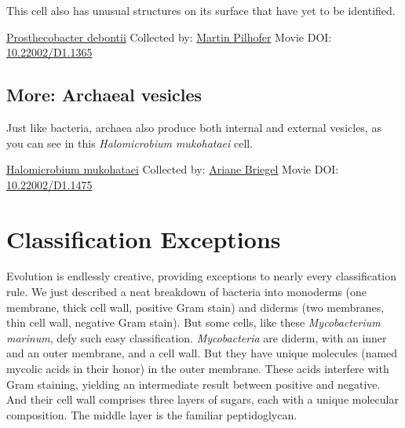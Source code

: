 \documentclass[]{tufte-book}
\begin{document}
This cell also has unusual structures on its surface that have yet to be identified.



\hypertarget{htmlwidget-8624b873ec5ec49f3b6a}{}

\label{fig:2-4d}\protect\hyperlink{tree}{Prosthecobacter debontii} Collected by: \protect\hyperlink{martin_pilhofer}{Martin Pilhofer} Movie DOI: \href{https://doi.org/10.22002/D1.1365}{10.22002/D1.1365}

\hypertarget{Archaeal_vesicles}{%
\subsection*{More: Archaeal vesicles}\label{Archaeal_vesicles}}

Just like bacteria, archaea also produce both internal and external vesicles, as you can see in this \emph{Halomicrobium mukohataei} cell.



\hypertarget{htmlwidget-d303e43101472cea8dda}{}

\label{fig:2-4e}\protect\hyperlink{tree}{Halomicrobium mukohataei} Collected by: \protect\hyperlink{ariane_briegel}{Ariane Briegel} Movie DOI: \href{https://doi.org/10.22002/D1.1475}{10.22002/D1.1475}

\hypertarget{classification-exceptions}{%
\section{Classification Exceptions}\label{classification-exceptions}}

Evolution is endlessly creative, providing exceptions to nearly every classification rule. We just described a neat breakdown of bacteria into monoderms (one membrane, thick cell wall, positive Gram stain) and diderms (two membranes, thin cell wall, negative Gram stain). But some cells, like these \emph{Mycobacterium marinum}, defy such easy classification. \emph{Mycobacteria} are diderm, with an inner and an outer membrane, and a cell wall. But they have unique molecules (named mycolic acids in their honor) in the outer membrane. These acids interfere with Gram staining, yielding an intermediate result between positive and negative. And their cell wall comprises three layers of sugars, each with a unique molecular composition. The middle layer is the familiar peptidoglycan.
\end{document}
